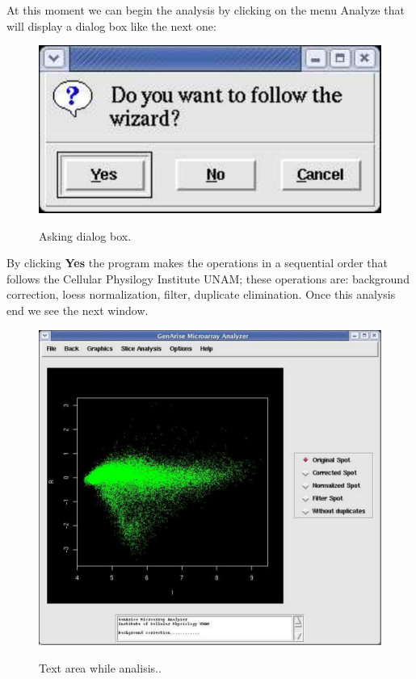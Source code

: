 \documentclass[12pt]{article}
\begin{document}
At this moment we can begin the analysis by clicking on the menu Analyze that will display a dialog box like the next one:
\begin{figure}[h]
\begin{center}
\includegraphics[scale= 0.3]{./images/wizarddialog.pdf}\\
\caption{Asking dialog box.\label{fig7}}
\end{center}
\end{figure}

By clicking \textbf{Yes }the program makes the operations in a sequential order that follows the Cellular Physilogy Institute UNAM; these operations are: background correction, loess normalization, filter, duplicate elimination. Once this analysis end we see the next window.

\begin{figure}[h]
\begin{center}
\includegraphics[scale= 0.3]{./images/wizardOriginal.pdf}\\
\caption{Text area while analisis.. \label{fig8}}
\end{center}
\end{figure}
\end{document}
